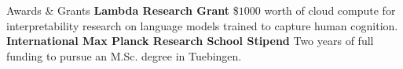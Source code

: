 \begin{rubric}{Awards \& Grants}
\entry*[2025] \textbf{Lambda Research Grant} \$$1000$ worth of cloud compute for interpretability research on language models trained to capture human cognition.
%
\entry*[2021 -- 2023] \textbf{International Max Planck Research School Stipend} Two years of full funding to pursue an M.Sc. degree in Tuebingen.
\end{rubric}